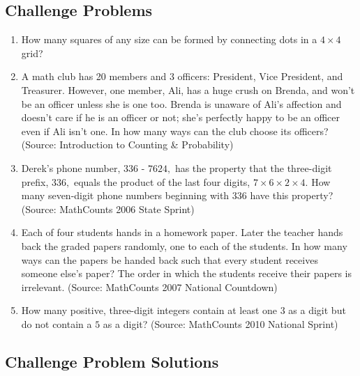 \documentclass[12pt, letterpaper]{article}
\begin{document}
\subsection{Challenge Problems}

\begin{enumerate}
    \item How many squares of any size can be formed by connecting dots in a $4 \times 4$ grid?
    \item A math club has 20 members and 3 officers: President, Vice President, and Treasurer. However, one member, Ali, has a huge crush on Brenda, and won't be an officer unless she is one too. Brenda is unaware of Ali's affection and doesn't care if he is an officer or not; she's perfectly happy to be an officer even if Ali isn't one. In how many ways can the club choose its officers? (Source: Introduction to Counting \& Probability)
    \item Derek's phone number, $336$ - $7624,$ has the property that the three-digit prefix, $336,$ equals the product of the last four digits, $7 \times 6 \times 2 \times 4.$ How many seven-digit phone numbers beginning with $336$ have this property? (Source: MathCounts 2006 State Sprint)
    \item Each of four students hands in a homework paper. Later the teacher hands back the graded papers randomly, one to each of the students. In how many ways can the papers be handed back such that every student receives someone else's paper? The order in which the students receive their papers is irrelevant. (Source: MathCounts 2007 National Countdown)
    \item How many positive, three-digit integers contain at least one $3$ as a digit but do not contain a $5$ as a digit? (Source: MathCounts 2010 National Sprint)
\end{enumerate}

\newpage
\subsection{Challenge Problem Solutions}
\end{document}

